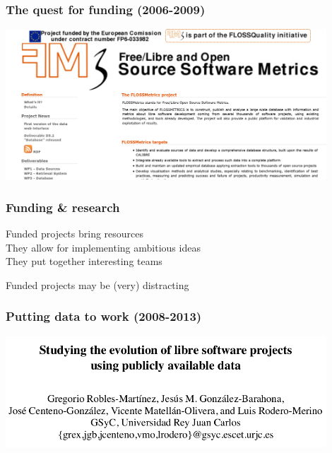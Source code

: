 \documentclass[17pt,aspectratio=169,hyperref=pdfusetitle]{beamer}
\begin{document}
\begin{frame}[fragile]
  \frametitle{The quest for funding (2006-2009)}

  \begin{center}
  \includegraphics[width=12cm]{figs/flossmetrics}
  \end{center}  
  
\end{frame}

\begin{frame}[fragile]
  \frametitle{Funding \& research}

  Funded projects bring resources \\
  They allow for implementing ambitious ideas \\
  They put together interesting teams \\
  
  \begin{center}
    Funded projects may be (very) distracting
  \end{center}  
  
\end{frame}



\begin{frame}[fragile]
  \frametitle{Putting data to work (2008-2013)}

  \begin{center}
  \includegraphics[width=12cm]{figs/evolution-data}
  \end{center}  
  
\end{frame}
\end{document}
